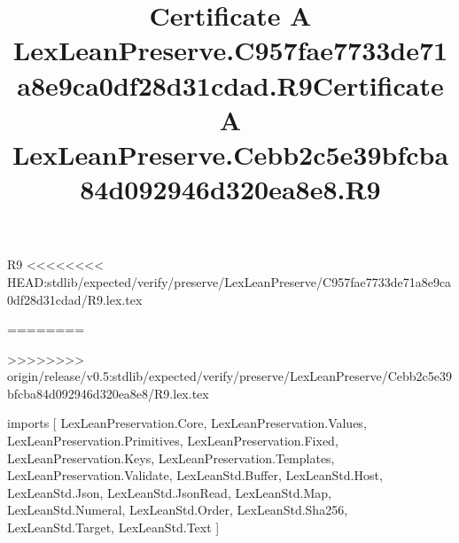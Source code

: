 \begin{lexlean}{R9}
<<<<<<<< HEAD:stdlib/expected/verify/preserve/LexLeanPreserve/C957fae7733de71a8e9ca0df28d31cdad/R9.lex.tex
\title{Certificate A LexLeanPreserve.C957fae7733de71a8e9ca0df28d31cdad.R9}
========
\title{Certificate A LexLeanPreserve.Cebb2c5e39bfcba84d092946d320ea8e8.R9}
>>>>>>>> origin/release/v0.5:stdlib/expected/verify/preserve/LexLeanPreserve/Cebb2c5e39bfcba84d092946d320ea8e8/R9.lex.tex
\begin{coremodule}
imports [
  LexLeanPreservation.Core,
  LexLeanPreservation.Values,
  LexLeanPreservation.Primitives,
  LexLeanPreservation.Fixed,
  LexLeanPreservation.Keys,
  LexLeanPreservation.Templates,
  LexLeanPreservation.Validate,
  LexLeanStd.Buffer,
  LexLeanStd.Host,
  LexLeanStd.Json,
  LexLeanStd.JsonRead,
  LexLeanStd.Map,
  LexLeanStd.Numeral,
  LexLeanStd.Order,
  LexLeanStd.Sha256,
  LexLeanStd.Target,
  LexLeanStd.Text
]


\end{coremodule}
\end{lexlean}
